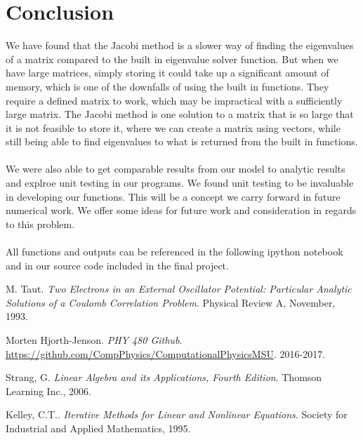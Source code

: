 \documentclass{article}
\begin{document}
\section{Conclusion}
We have found that the Jacobi method is a slower way of finding the eigenvalues of a matrix compared to the built in eigenvalue solver function. But when we have large matrices, simply storing it could take up a significant amount of memory, which is one of the downfalls of using the built in functions. They require a defined matrix to work, which may be impractical with a sufficiently large matrix. The Jacobi method is one solution to a matrix that is so large that it is not feasible to store it, where we can create a matrix using vectors, while still being able to find eigenvalues to what is returned from the built in functions.\\
\\
We were also able to get comparable results from our model to analytic results and explroe unit testing in our programs. We found unit testing to be invaluable in developing our functions. This will be a concept we carry forward in future numerical work. We offer some ideas for future work and consideration in regards to this problem.\\
\\
All functions and outputs can be referenced in the following ipython notebook and in our source code included in the final project.

\begin{thebibliography}{4}
 M. Taut. \textit{Two Electrons in an External Oscillator Potential: Particular Analytic Solutions of a Coulomb Correlation Problem}. Physical Review A, November, 1993.  

 Morten Hjorth-Jenson. \textit{PHY 480 Github}.\\ \url{https://github.com/CompPhysics/ComputationalPhysicsMSU}. 2016-2017.

 Strang, G. \textit{Linear Algebra and its Applications, Fourth Edition}. Thomson Learning Inc., 2006.

 Kelley, C.T.. \textit{Iterative Methods for Linear
and Nonlinear Equations}. Society for Industrial and Applied Mathematics, 1995.


\end{thebibliography}


\end{document}
